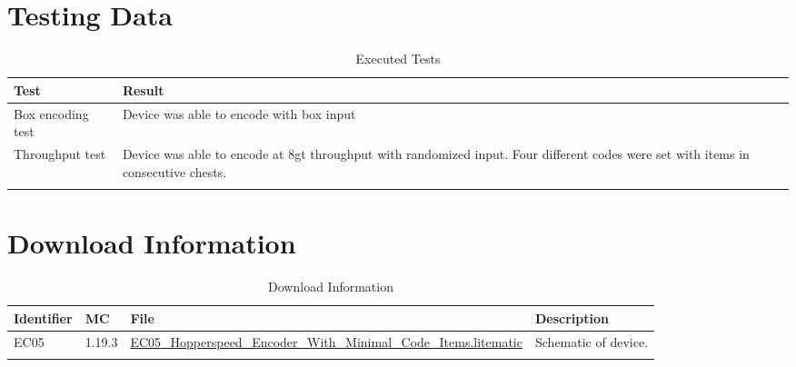 \documentclass[10pt]{datasheet}
\begin{document}
\section{Testing Data}
\begin{table}[h]
\caption{Executed Tests}
\begin{tabularx}{\textwidth}{l | X}
    \thickhline
    \textbf{Test} & \textbf{Result} \\
    \hline
    Box encoding test & Device was able to encode with box input \\
    \hline
    Throughput test & Device was able to encode at 8gt throughput with randomized input. Four different codes were set with items in consecutive chests. \\
    \thickhline
\end{tabularx}
\end{table}

\section{Download Information}
\begin{table}[h]
    \caption{Download Information}
    \begin{tabularx}{\textwidth}{l | l | l | X}
        \thickhline
        \textbf{Identifier} & \textbf{MC} & \textbf{File} & \textbf{Description} \\
        \hline
        EC05 & 1.19.3 & \href{https://github.com/Soontech-Annals/Archive/blob/b56572c0d2b4f182d9e9d41449d8cb2963b923ae/Archive/encoders/EC05\%20Hopperspeed\%20Encoder\%20With\%20Minimal\%20Code\%20Items/EC05\_Hopperspeed\_Encoder\_With\_Minimal\_Code\_Items.litematic?raw=1}{EC05\_Hopperspeed\_Encoder\_With\_Minimal\_Code\_Items.litematic} & Schematic of device. \\
        \hline
        \thickhline
    \end{tabularx}
\end{table}
\end{document}
